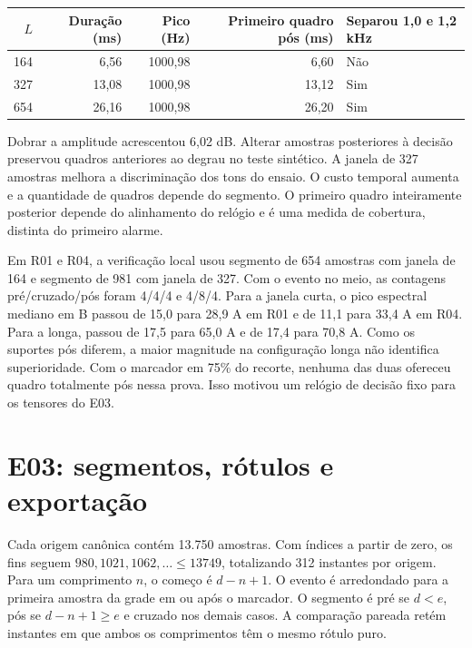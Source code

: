 \documentclass[11pt,a4paper]{article}
\begin{document}
\begin{center}
\begin{tabular}{@{}rrrrl@{}}\toprule
$L$ & Duração (ms) & Pico (Hz) & Primeiro quadro pós (ms) & Separou 1,0 e 1,2 kHz\\\midrule
164 & 6,56 & 1000,98 & 6,60 & Não\\
327 & 13,08 & 1000,98 & 13,12 & Sim\\
654 & 26,16 & 1000,98 & 26,20 & Sim\\\bottomrule
\end{tabular}
\end{center}
Dobrar a amplitude acrescentou 6,02 dB. Alterar amostras posteriores à decisão preservou quadros anteriores ao degrau no teste sintético. A janela de 327 amostras melhora a discriminação dos tons do ensaio. O custo temporal aumenta e a quantidade de quadros depende do segmento. O primeiro quadro inteiramente posterior depende do alinhamento do relógio e é uma medida de cobertura, distinta do primeiro alarme.

Em R01 e R04, a verificação local usou segmento de 654 amostras com janela de 164 e segmento de 981 com janela de 327. Com o evento no meio, as contagens pré/cruzado/pós foram 4/4/4 e 4/8/4. Para a janela curta, o pico espectral mediano em B passou de 15,0 para 28,9 A em R01 e de 11,1 para 33,4 A em R04. Para a longa, passou de 17,5 para 65,0 A e de 17,4 para 70,8 A. Como os suportes pós diferem, a maior magnitude na configuração longa não identifica superioridade. Com o marcador em 75\% do recorte, nenhuma das duas ofereceu quadro totalmente pós nessa prova. Isso motivou um relógio de decisão fixo para os tensores do E03.

\section{E03: segmentos, rótulos e exportação}
Cada origem canônica contém 13.750 amostras. Com índices a partir de zero, os fins seguem $980,1021,1062,\ldots\le13749$, totalizando 312 instantes por origem. Para um comprimento $n$, o começo é $d-n+1$. O evento é arredondado para a primeira amostra da grade em ou após o marcador. O segmento é pré se $d<e$, pós se $d-n+1\ge e$ e cruzado nos demais casos. A comparação pareada retém instantes em que ambos os comprimentos têm o mesmo rótulo puro.
\end{document}

